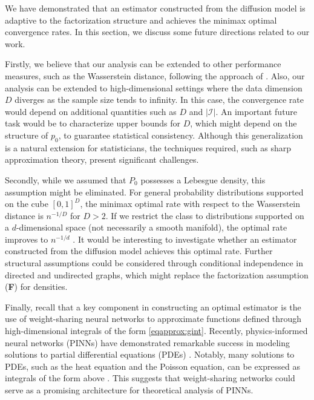 \documentclass[twoside,11pt]{article}
\def\cI{\mathcal I}
\newcommand{\bF}{{\bf F}}
\begin{document}
We have demonstrated that an estimator constructed from the diffusion model is adaptive to the factorization structure and achieves the minimax optimal convergence rates.
In this section, we discuss some future directions related to our work.

Firstly, we believe that our analysis can be extended to other performance measures, such as the Wasserstein distance, following the approach of \citet{oko2023diffusion}. Also, our analysis can be extended to high-dimensional settings where the data dimension $D$ diverges as the sample size tends to infinity.
In this case, the convergence rate would depend on additional quantities such as $D$ and $|\cI|$.
An important future task would be to characterize upper bounds for $D$, which might depend on the structure of $p_0$, to guarantee statistical consistency.
Although this generalization is a natural extension for statisticians, the techniques required, such as sharp approximation theory, present significant challenges.

Secondly, while we assumed that $P_0$ possesses a Lebesgue density, this assumption might be eliminated.
For general probability distributions supported on the cube $[0,1]^D$, the minimax optimal rate with respect to the Wasserstein distance is $n^{-1/D}$ for $D > 2$.
If we restrict the class to distributions supported on a $d$-dimensional space (not necessarily a smooth manifold), the optimal rate improves to $n^{-1/d}$ \citep{weed2019sharp}.
It would be interesting to investigate whether an estimator constructed from the diffusion model achieves this optimal rate.
Further structural assumptions could be considered through conditional independence in directed and undirected graphs, which might replace the factorization assumption (\bF) for densities.

Finally, recall that a key component in constructing an optimal estimator is the use of weight-sharing neural networks to approximate functions defined through high-dimensional integrals of the form \eqref{eqapprox:gint}.
Recently, physics-informed neural networks (PINNs) have demonstrated remarkable success in modeling solutions to partial differential equations (PDEs) \citep{karniadakis2021physics, raissi2019physics}.
Notably, many solutions to PDEs, such as the heat equation and the Poisson equation, can be expressed as integrals of the form above \citep{courant2008methods}.
This suggests that weight-sharing networks could serve as a promising architecture for theoretical analysis of PINNs.
\end{document}

